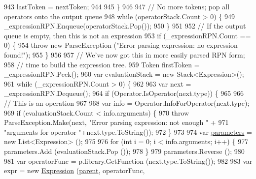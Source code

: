 \begin{DoxyCode}
943                     lastToken = nextToken;
944 
945                 \}
946 
947                 \textcolor{comment}{// No more tokens; pop all operators onto the output queue}
948                 \textcolor{keywordflow}{while} (operatorStack.Count > 0) \{
949                     \_expressionRPN.Enqueue(operatorStack.Pop());
950                 \}
951 
952                 \textcolor{comment}{// If the output queue is empty, then this is not an expression}
953                 \textcolor{keywordflow}{if} (\_expressionRPN.Count == 0) \{
954                     \textcolor{keywordflow}{throw} \textcolor{keyword}{new} ParseException (\textcolor{stringliteral}{"Error parsing expression: no expression found!"});
955                 \}
956 
957                 \textcolor{comment}{// We've now got this in more easily parsed RPN form;}
958                 \textcolor{comment}{// time to build the expression tree.}
959                 Token firstToken = \_expressionRPN.Peek();
960                 var evaluationStack = \textcolor{keyword}{new} Stack<Expression>();
961                 \textcolor{keywordflow}{while} (\_expressionRPN.Count > 0) \{
962 
963                     var next = \_expressionRPN.Dequeue();
964                     \textcolor{keywordflow}{if} (Operator.IsOperator(next.type)) \{
965 
966                         \textcolor{comment}{// This is an operation}
967 
968                         var info = Operator.InfoForOperator(next.type);
969                         \textcolor{keywordflow}{if} (evaluationStack.Count < info.arguments) \{
970                             \textcolor{keywordflow}{throw} ParseException.Make(next, \textcolor{stringliteral}{"Error parsing expression: not enough "} +
971                                 \textcolor{stringliteral}{"arguments for operator "}+next.type.ToString());
972                         \}
973 
974                         var \hyperlink{a00094_a7b21380bead8ae08b2cfc6594edab32c}{parameters} = \textcolor{keyword}{new} List<Expression> ();
975 
976                         \textcolor{keywordflow}{for} (\textcolor{keywordtype}{int} i = 0; i < info.arguments; i++) \{
977                             parameters.Add (evaluationStack.Pop ());
978                         \}
979                         parameters.Reverse ();
980 
981                         var operatorFunc = p.library.GetFunction (next.type.ToString());
982 
983                         var expr = \textcolor{keyword}{new} \hyperlink{a00094_a17e5101d02b96d0071e7a0223e4daa3d}{Expression} (\hyperlink{a00138_af313a82103fcc2ff5a177dbb06b92f7b}{parent}, operatorFunc, 

\end{DoxyCode}

